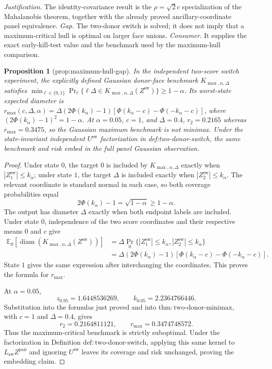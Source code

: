 \documentclass{article}
\newtheorem{proposition}{Proposition}
\begin{document}
\par\smallskip\noindent \textit{Justification.} The identity-covariance result is the \(\rho=\sqrt2c\) specialization of the Mahalanobis theorem, together with the already proved ancillary-coordinate panel equivalence. \textit{Gap.} The two-donor switch is solved; it does not imply that a maximum-critical hull is optimal on larger face unions. \textit{Consumer.} It supplies the exact early-kill-test value and the benchmark used by the maximum-hull comparison.

\begin{proposition}[prop:maximum-hull-gap]\label{prop:maximum-hull-gap}
In the independent two-score switch experiment, the explicitly defined Gaussian donor-face benchmark \(K_{\max,\alpha,\Delta}\) satisfies \(\min_{\ell\in\{0,1\}}\Pr_{\ell}\{\ell\Delta\in K_{\max,\alpha,\Delta}(Z^{\mathrm{sw}})\}\ge1-\alpha\). Its worst-state expected diameter is \(r_{\max}(c,\Delta,\alpha)=\Delta(2\Phi(k_{\alpha})-1)[\Phi(k_{\alpha}-c)-\Phi(-k_{\alpha}-c)]\), where \((2\Phi(k_{\alpha})-1)^2=1-\alpha\). At \(\alpha=0.05\), \(c=1\), and \(\Delta=0.4\), \(r_2=0.2165\) whereas \(r_{\max}=0.3475\), so the Gaussian maximum benchmark is not minimax. Under the state-invariant independent \(U^{\mathrm{sw}}\) factorization in def:two-donor-switch, the same benchmark and risk embed in the full panel Gaussian observation.
\end{proposition}
\begin{proof}
Under state \(0\), the target \(0\) is included by \(K_{\max,\alpha,\Delta}\) exactly when \(|Z_1^{\mathrm{sw}}|\le k_\alpha\); under state \(1\), the target \(\Delta\) is included exactly when \(|Z_2^{\mathrm{sw}}|\le k_\alpha\).  The relevant coordinate is standard normal in each case, so both coverage probabilities equal
\[
 2\Phi(k_\alpha)-1=\sqrt{1-\alpha}\ge1-\alpha.
\]
The output has diameter \(\Delta\) exactly when both endpoint labels are included.  Under state \(0\), independence of the two score coordinates and their respective means \(0\) and \(c\) give
\[
\begin{aligned}
 \mathbb E_0[\operatorname{diam}(K_{\max,\alpha,\Delta}(Z^{\mathrm{sw}}))]
 &=\Delta\Pr_0\{|Z_1^{\mathrm{sw}}|\le k_\alpha,
                    |Z_2^{\mathrm{sw}}|\le k_\alpha\}\\
 &=\Delta(2\Phi(k_\alpha)-1)
   [\Phi(k_\alpha-c)-\Phi(-k_\alpha-c)].
\end{aligned}
\]
State \(1\) gives the same expression after interchanging the coordinates.  This proves the formula for \(r_{\max}\).

At \(\alpha=0.05\),
\[
 z_{0.95}=1.6448536269,
 \qquad
 k_{0.05}=2.2364766446.
\]
Substitution into the formulas just proved and into \(\mathrm{thm:two\text{-}donor\text{-}minimax}\), with \(c=1\) and \(\Delta=0.4\), gives
\[
 r_2=0.2164811121,
 \qquad
 r_{\max}=0.3474748572.
\]
Thus the maximum-critical benchmark is strictly suboptimal.  Under the factorization in Definition \(\mathrm{def:two\text{-}donor\text{-}switch}\), applying this same kernel to \(L_{\mathrm{sw}}Z^{\mathrm{pan}}\) and ignoring \(U^{\mathrm{sw}}\) leaves its coverage and risk unchanged, proving the embedding claim.
\end{proof}
\end{document}
